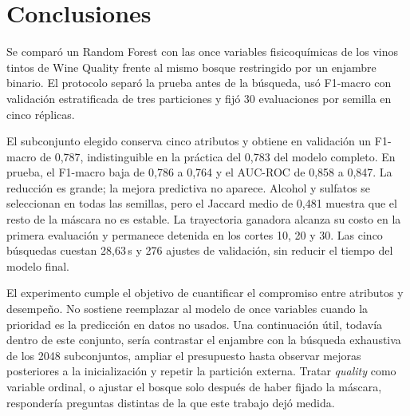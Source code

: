 \documentclass[conference]{IEEEtran}
\begin{document}
\section{Conclusiones}
Se comparó un Random Forest con las once variables fisicoquímicas de los vinos tintos de Wine Quality frente al mismo bosque restringido por un enjambre binario. El protocolo separó la prueba antes de la búsqueda, usó F1-macro con validación estratificada de tres particiones y fijó 30 evaluaciones por semilla en cinco réplicas.

El subconjunto elegido conserva cinco atributos y obtiene en validación un F1-macro de 0,787, indistinguible en la práctica del 0,783 del modelo completo. En prueba, el F1-macro baja de 0,786 a 0,764 y el AUC-ROC de 0,858 a 0,847. La reducción es grande; la mejora predictiva no aparece. Alcohol y sulfatos se seleccionan en todas las semillas, pero el Jaccard medio de 0,481 muestra que el resto de la máscara no es estable. La trayectoria ganadora alcanza su costo en la primera evaluación y permanece detenida en los cortes 10, 20 y 30. Las cinco búsquedas cuestan 28,63\,s y 276 ajustes de validación, sin reducir el tiempo del modelo final.

El experimento cumple el objetivo de cuantificar el compromiso entre atributos y desempeño. No sostiene reemplazar al modelo de once variables cuando la prioridad es la predicción en datos no usados. Una continuación útil, todavía dentro de este conjunto, sería contrastar el enjambre con la búsqueda exhaustiva de los 2048 subconjuntos, ampliar el presupuesto hasta observar mejoras posteriores a la inicialización y repetir la partición externa. Tratar \emph{quality} como variable ordinal, o ajustar el bosque solo después de haber fijado la máscara, respondería preguntas distintas de la que este trabajo dejó medida.
\end{document}
